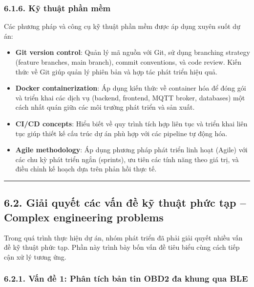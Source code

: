 \documentclass[13pt,a4paper]{extarticle}
\renewcommand{\\}{\thesislongtableorignewline\hline}%
\providecommand{\tightlist}{%
  \setlength{\itemsep}{0pt}\setlength{\parskip}{0pt}}
\begin{document}
\subsubsection{6.1.6. Kỹ thuật phần
mềm}\label{616-kux1ef9-thuux1eadt-phux1ea7n-mux1ec1m}

Các phương pháp và công cụ kỹ thuật phần mềm được áp dụng xuyên suốt dự
án:

\begin{itemize}
\tightlist
\item
  \textbf{Git version control}: Quản lý mã nguồn với Git, sử dụng
  branching strategy (feature branches, main branch), commit
  conventions, và code review. Kiến thức về Git giúp quản lý phiên bản
  và hợp tác phát triển hiệu quả.
\item
  \textbf{Docker containerization}: Áp dụng kiến thức về container hóa
  để đóng gói và triển khai các dịch vụ (backend, frontend, MQTT broker,
  databases) một cách nhất quán giữa các môi trường phát triển và sản
  xuất.
\item
  \textbf{CI/CD concepts}: Hiểu biết về quy trình tích hợp liên tục và
  triển khai liên tục giúp thiết kế cấu trúc dự án phù hợp với các
  pipeline tự động hóa.
\item
  \textbf{Agile methodology}: Áp dụng phương pháp phát triển linh hoạt
  (Agile) với các chu kỳ phát triển ngắn (sprints), ưu tiên các tính
  năng theo giá trị, và điều chỉnh kế hoạch dựa trên phản hồi thực tế.
\end{itemize}

\begin{center}\rule{0.5\linewidth}{0.5pt}\end{center}

\subsection{6.2. Giải quyết các vấn đề kỹ thuật phức tạp -- Complex engineering problems}\label{62-giux1ea3i-quyux1ebft-cuxe1c-vux1ea5n-ux111ux1ec1-kux1ef9-thuux1eadt-phux1ee9c-tux1ea1p--complex-engineering-problems}

Trong quá trình thực hiện dự án, nhóm phát triển đã phải giải quyết
nhiều vấn đề kỹ thuật phức tạp. Phần này trình bày bốn vấn đề tiêu biểu
cùng cách tiếp cận xử lý tương ứng.

\subsubsection{6.2.1. Vấn đề 1: Phân tích bản tin OBD2 đa khung qua
BLE}\label{621-vux1ea5n-ux111ux1ec1-1-phuxe2n-tuxedch-bux1ea3n-tin-obd2-ux111a-khung-qua-ble}
\end{document}
